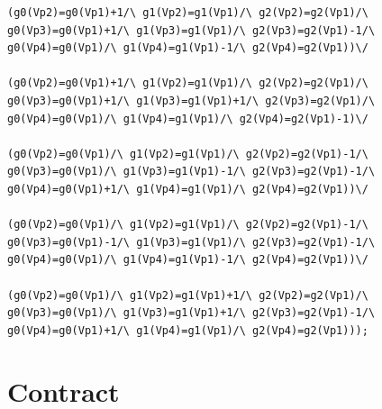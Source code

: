 \begin{appendices}
\begin{lstlisting}
(g0(Vp2)=g0(Vp1)+1/\ g1(Vp2)=g1(Vp1)/\ g2(Vp2)=g2(Vp1)/\ g0(Vp3)=g0(Vp1)+1/\ g1(Vp3)=g1(Vp1)/\ g2(Vp3)=g2(Vp1)-1/\ g0(Vp4)=g0(Vp1)/\ g1(Vp4)=g1(Vp1)-1/\ g2(Vp4)=g2(Vp1))\/ 

(g0(Vp2)=g0(Vp1)+1/\ g1(Vp2)=g1(Vp1)/\ g2(Vp2)=g2(Vp1)/\ g0(Vp3)=g0(Vp1)+1/\ g1(Vp3)=g1(Vp1)+1/\ g2(Vp3)=g2(Vp1)/\ g0(Vp4)=g0(Vp1)/\ g1(Vp4)=g1(Vp1)/\ g2(Vp4)=g2(Vp1)-1)\/ 

(g0(Vp2)=g0(Vp1)/\ g1(Vp2)=g1(Vp1)/\ g2(Vp2)=g2(Vp1)-1/\ g0(Vp3)=g0(Vp1)/\ g1(Vp3)=g1(Vp1)-1/\ g2(Vp3)=g2(Vp1)-1/\ g0(Vp4)=g0(Vp1)+1/\ g1(Vp4)=g1(Vp1)/\ g2(Vp4)=g2(Vp1))\/ 

(g0(Vp2)=g0(Vp1)/\ g1(Vp2)=g1(Vp1)/\ g2(Vp2)=g2(Vp1)-1/\ g0(Vp3)=g0(Vp1)-1/\ g1(Vp3)=g1(Vp1)/\ g2(Vp3)=g2(Vp1)-1/\ g0(Vp4)=g0(Vp1)/\ g1(Vp4)=g1(Vp1)-1/\ g2(Vp4)=g2(Vp1))\/ 

(g0(Vp2)=g0(Vp1)/\ g1(Vp2)=g1(Vp1)+1/\ g2(Vp2)=g2(Vp1)/\ g0(Vp3)=g0(Vp1)/\ g1(Vp3)=g1(Vp1)+1/\ g2(Vp3)=g2(Vp1)-1/\ g0(Vp4)=g0(Vp1)+1/\ g1(Vp4)=g1(Vp1)/\ g2(Vp4)=g2(Vp1)));
\end{lstlisting}
\section{Contract}
\label{appendix:contract}




\end{appendices}